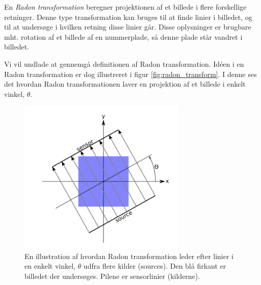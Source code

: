 En \textit{Radon transformation} beregner projektionen af et billede i flere forskellige retninger\cite{matlab_radon}. Denne type transformation kan bruges til at finde linier i billedet, og til at undersøge i hvilken retning disse linier går. Disse oplysninger er brugbare mht. rotation af et billede af en nummerplade, så denne plade står vandret i billedet.






Vi vil undlade at gennemgå definitionen af Radon transformation. Idéen i en Radon transformation er dog illustreret i figur \vref{fig:radon_transform}. I denne ses det hvordan Radon transformationen laver en projektion af et billede i enkelt vinkel, $\theta$. 


\begin{figure}[htp]
  \centering
  \includegraphics[width=8cm]{system/illu/radon.png}
  \caption{En illustration af hvordan Radon transformation leder efter linier i en enkelt vinkel, $\theta$ udfra flere kilder (sources). Den blå firkant er billedet der undersøges. Pilene er sensorlinier (kilderne).\cite{matlab_radon}}
  \label{fig:radon_transform}
\end{figure}

